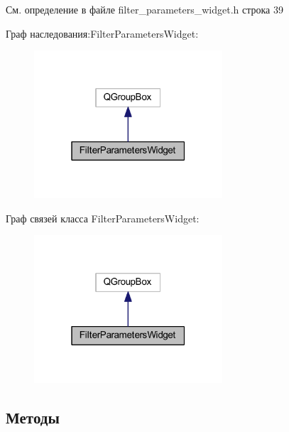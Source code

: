 См. определение в файле filter\+\_\+parameters\+\_\+widget.\+h строка 39



Граф наследования\+:Filter\+Parameters\+Widget\+:
\nopagebreak
\begin{figure}[H]
\begin{center}
\leavevmode
\includegraphics[width=199pt]{class_filter_parameters_widget__inherit__graph}
\end{center}
\end{figure}


Граф связей класса Filter\+Parameters\+Widget\+:
\nopagebreak
\begin{figure}[H]
\begin{center}
\leavevmode
\includegraphics[width=199pt]{class_filter_parameters_widget__coll__graph}
\end{center}
\end{figure}


\subsection{Методы}
\hypertarget{class_filter_parameters_widget_a8efc68dd4f006fa773873aa6710fbc33}{}\label{class_filter_parameters_widget_a8efc68dd4f006fa773873aa6710fbc33} 
